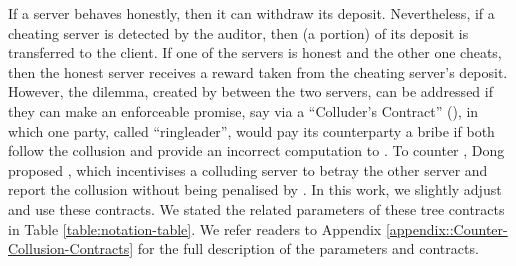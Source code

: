If a server behaves honestly, then it can withdraw its deposit. Nevertheless, if a cheating server is detected by the auditor, then (a portion) of its deposit is transferred to the client. If one of the servers is honest and the other one cheats, then the honest server receives a reward taken from the cheating server's deposit. However, the dilemma, created by \SCpc between the two servers, can be addressed if they can make an enforceable promise, say via a ``Colluder's Contract'' (\SCcc),  in which one party, called ``ringleader'', would pay its counterparty a bribe if both follow the collusion and provide an incorrect computation to \SCpc. To counter \SCcc, Dong   \et proposed \SCtc, which incentivises a colluding server to betray the other server and report the collusion without being penalised by \SCpc. In this work, we slightly adjust and use these contracts. We stated the related parameters of these tree contracts in Table \ref{table:notation-table}. We refer readers to Appendix \ref{appendix::Counter-Collusion-Contracts} for the full description of the parameters and contracts. 




%

